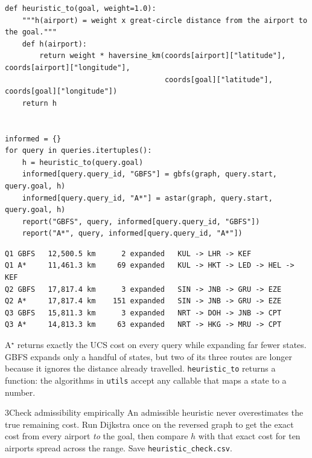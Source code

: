 \begin{labanswer}
\begin{lstlisting}[style=utppython]
def heuristic_to(goal, weight=1.0):
    """h(airport) = weight x great-circle distance from the airport to the goal."""
    def h(airport):
        return weight * haversine_km(coords[airport]["latitude"], coords[airport]["longitude"],
                                     coords[goal]["latitude"], coords[goal]["longitude"])
    return h


informed = {}
for query in queries.itertuples():
    h = heuristic_to(query.goal)
    informed[query.query_id, "GBFS"] = gbfs(graph, query.start, query.goal, h)
    informed[query.query_id, "A*"] = astar(graph, query.start, query.goal, h)
    report("GBFS", query, informed[query.query_id, "GBFS"])
    report("A*", query, informed[query.query_id, "A*"])
\end{lstlisting}
\expectedoutput
\begin{lstlisting}[style=utpterminal]
Q1 GBFS   12,500.5 km      2 expanded   KUL -> LHR -> KEF
Q1 A*     11,461.3 km     69 expanded   KUL -> HKT -> LED -> HEL -> KEF
Q2 GBFS   17,817.4 km      3 expanded   SIN -> JNB -> GRU -> EZE
Q2 A*     17,817.4 km    151 expanded   SIN -> JNB -> GRU -> EZE
Q3 GBFS   15,811.3 km      3 expanded   NRT -> DOH -> JNB -> CPT
Q3 A*     14,813.3 km     63 expanded   NRT -> HKG -> MRU -> CPT
\end{lstlisting}
A$^\star$ returns exactly the UCS cost on every query while expanding far fewer states. GBFS expands only a handful of states, but two of its three routes are longer because it ignores the distance already travelled. \texttt{heuristic\_to} returns a function: the algorithms in \texttt{utils} accept any callable that maps a state to a number.
\end{labanswer}

\begin{labquestion}{3}{Check admissibility empirically}
An admissible heuristic never overestimates the true remaining cost. Run Dijkstra once on the reversed graph to get the exact cost from every airport \emph{to} the goal, then compare $h$ with that exact cost for ten airports spread across the range. Save \texttt{heuristic\_check.csv}.
\end{labquestion}

